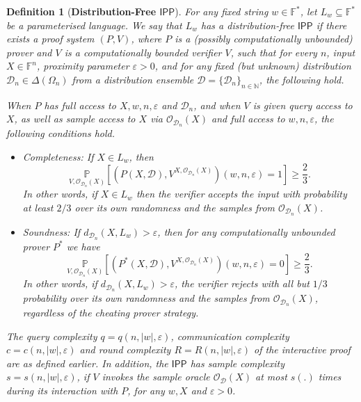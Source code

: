 \documentclass[11pt]{article}
\newtheorem{definition}{Definition}[section]
\newcommand{\IPP}{\mathsf{IPP}}
\newcommand{\F}{\mathbb{F}}
\newcommand{\N}{\mathbb{N}}
\newcommand{\sD}{\mathcal{D}}
\begin{document}
\begin{definition}[\textbf{Distribution-Free $\IPP$}]
\label{def:df_ipp}
For any fixed string $w \in \F^*$, let $L_w \subseteq \F^*$ be a parameterised language. We say that $L_w$ has a distribution-free $\IPP$ if there exists a proof system $(P,V)$, where $P$ is a (possibly computationally unbounded) prover and $V$ is a computationally bounded verifier $V$, such that for every $n$, input $X \in \F^n$, proximity parameter $\varepsilon > 0$, and for any fixed (but unknown) distribution $\sD_{n} \in \Delta(\Omega_n)$ from a distribution ensemble $\sD = \{\sD_n\}_{n \in \N}$, the following hold.

When $P$ has full access to $X,w,n,\varepsilon$ and $\sD_{n}$, and when $V$ is given query access to $X$, as well as sample access to $X$ via $\mathcal{O}_{\sD_{n}}(X)$ and full access to $w,n,\varepsilon$, the following conditions hold.
\begin{itemize}
   \item Completeness: If $X \in L_w$, then
    \begin{equation*}
        \underset{V, \mathcal{O}_{\sD_{n}}(X)}{\mathbb{P}}\left[ \left( P(X,\mathcal{D}),V^{X, \mathcal{O}_{\sD_{n}}(X)} \right)(w,n,\varepsilon) = 1 \right] \geq \frac{2}{3}.
    \end{equation*}
    In other words, if $X\in L_w$ then the verifier accepts the input with probability at least $2/3$ over its own randomness and the samples from $\mathcal{O}_{\sD_{n}}(X)$.

    \item Soundness: If $d_{\sD_{n}} (X, L_w)>\varepsilon$, then for any computationally unbounded prover $P^{\ast}$ we have 
    \begin{equation*}
        \underset{V, \mathcal{O}_{\sD_{n}}(X)}{\mathbb{P}} \left[ \left( P^{\ast}(X,\mathcal{D}),V^{X, \mathcal{O}_{\sD_{n}}(X)} \right)(w,n,\varepsilon)=0 \right]\geq \frac{2}{3}.
    \end{equation*}
    In other words, if $d_{\sD_{n}}(X,L_w) > \varepsilon$, the verifier rejects with all but $1/3$ probability over its own randomness and the samples from $\mathcal{O}_{\sD_{n}}(X)$, regardless of the cheating prover strategy.
\end{itemize}

The query complexity $q = q(n,\vert w \vert, \varepsilon)$, communication complexity $c = c(n,\vert w \vert, \varepsilon)$ and round complexity $R = R(n, \vert w \vert, \varepsilon)$ of the interactive proof are as defined earlier. In addition, the $\IPP$ has \textit{sample complexity} $s = s(n, \vert w \vert, \varepsilon)$, if $V$ invokes the sample oracle $\mathcal{O}_\sD(X)$ at most $s(.)$ times during its interaction with $P$, for any $w,X$ and $\varepsilon > 0$. 
\end{definition}
\end{document}
